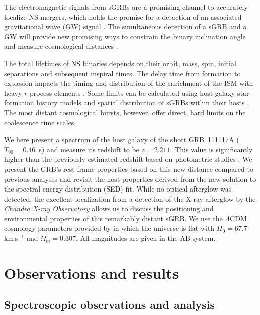 \documentclass{aa}    %
\begin{document}
The electromagnetic signals from sGRBs are a promising channel to accurately
localize NS mergers, which holds the promise for a detection of an associated
gravitational wave (GW) signal \citep{Ghirlanda2016}. The simultaneous detection
of a sGRB and a GW will provide new promising ways to constrain the binary
inclination angle \citep{Arun2014} and measure cosmological distances
\citep{Nissanke2010}.

The total lifetimes of NS binaries depends on their orbit, mass, spin, initial
separations and subsequent inspiral times. The delay time from formation to
explosion impacts the timing and distribution of the enrichment of the ISM with
heavy $r$-process elements \citep{VandeVoort2015, Wallner2015,  Ji2016}. Some
limits can be calculated using host galaxy star-formation history models and
spatial distribution of sGRBs within their hosts \citep[][]{Berger2014}. The
most distant cosmological bursts, however, offer direct, hard limits on the
coalescence time scales.

We here present a spectrum of the host galaxy of the short
GRB~111117A ($T_{90}=0.46$~s) and measure its redshift to be $z=2.211$. This
value is significantly higher than the previously estimated redshift based on
photometric studies \citep{Margutti2012,Sakamoto2013}. We present the GRB's rest
frame properties based on this new distance compared to previous analyses and
revisit the host properties derived from the new solution to the spectral energy distribution (SED) fit.
While no optical afterglow was detected, the excellent localization from a
detection of the X-ray afterglow by the \emph{Chandra X-ray Observatory}
allows us to discuss the positioning and environmental properties of this
remarkably distant sGRB.
We use the $\Lambda$CDM cosmology parameters provided by
\citet{Planck2015} in which the universe is flat with $H_0 = 67.7$\,km\,s$^{-1}$
and $\Omega_m = 0.307$. All magnitudes are given in the AB system.


\section{Observations and results}

\subsection{Spectroscopic observations and analysis}
\end{document}
